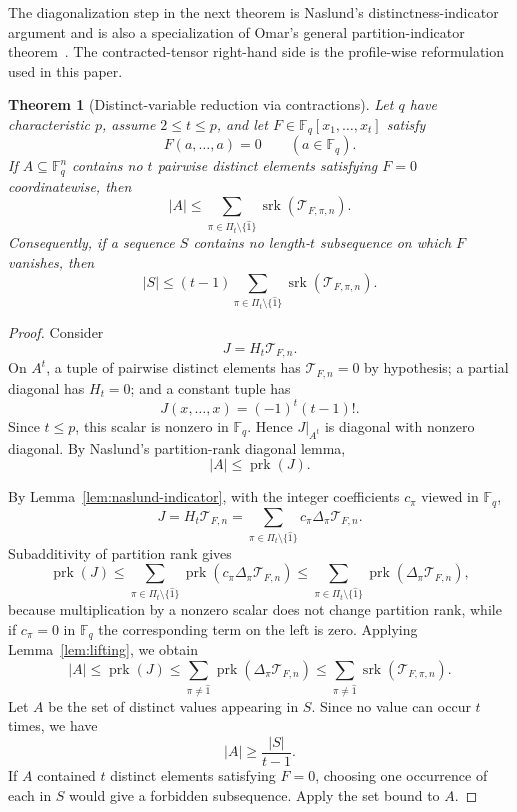 \documentclass[10pt,a4paper]{amsart}
\newtheorem{theorem}{Theorem}[section]
\theoremstyle{definition}
\newcommand{\F}{\mathbb F}
\newcommand{\srk}{\operatorname{srk}}
\newcommand{\prk}{\operatorname{prk}}
\newcommand{\1}{\mathbf 1}
\newcommand{\Tau}{\mathcal T}
\begin{document}
The diagonalization step in the next theorem is Naslund's distinctness-indicator argument and is also a specialization of Omar's general partition-indicator theorem~\cite[Theorem~8]{OmarPartition}.  The contracted-tensor right-hand side is the profile-wise reformulation used in this paper.

\begin{theorem}[Distinct-variable reduction via contractions]\label{thm:distinct-reduction}
Let $q$ have characteristic $p$, assume $2\le t\le p$, and let $F\in\F_q[x_1,\ldots,x_t]$ satisfy
\[
 F(a,\ldots,a)=0\qquad(a\in\F_q).
\]
If $A\subseteq\F_q^n$ contains no $t$ pairwise distinct elements satisfying $F=0$ coordinatewise, then
\[
 |A|
 \le
 \sum_{\pi\in\Pi_t\setminus\{\widehat1\}}
 \srk(\Tau_{F,\pi,n}).
\]
Consequently, if a sequence $S$ contains no length-$t$ subsequence on which $F$ vanishes, then
\[
 |S|
 \le
 (t-1)
 \sum_{\pi\in\Pi_t\setminus\{\widehat1\}}
 \srk(\Tau_{F,\pi,n}).
\]
\end{theorem}

\begin{proof}
Consider
\[
 J=H_t\Tau_{F,n}.
\]
On $A^t$, a tuple of pairwise distinct elements has
$\Tau_{F,n}=0$ by hypothesis; a partial diagonal has $H_t=0$;
and a constant tuple has
\[
 J(x,\ldots,x)=(-1)^t(t-1)!.
\]
Since $t\le p$, this scalar is nonzero in $\F_q$. Hence
$J|_{A^t}$ is diagonal with nonzero diagonal. By Naslund's
partition-rank diagonal lemma,
\[
 |A|\le\prk(J).
\]

By Lemma~\ref{lem:naslund-indicator}, with the integer coefficients
$c_\pi$ viewed in $\F_q$,
\[
 J
 =H_t\Tau_{F,n}
 =\sum_{\pi\in\Pi_t\setminus\{\widehat1\}}
 c_\pi\Delta_\pi\Tau_{F,n}.
\]
{Subadditivity of partition rank gives
\[
 \prk(J)
 \le
 \sum_{\pi\in\Pi_t\setminus\{\widehat1\}}
 \prk(c_\pi\Delta_\pi\Tau_{F,n})
 \le
 \sum_{\pi\in\Pi_t\setminus\{\widehat1\}}
 \prk(\Delta_\pi\Tau_{F,n}),
\]
because multiplication by a nonzero scalar does not change partition
rank, while if $c_\pi=0$ in $\F_q$ the corresponding term on the
left is zero. Applying Lemma~\ref{lem:lifting}, we obtain
\[
 |A|
 \le\prk(J)
 \le\sum_{\pi\ne\widehat1}\prk(\Delta_\pi\Tau_{F,n})
 \le\sum_{\pi\ne\widehat1}\srk(\Tau_{F,\pi,n}).
\]
Let \(A\) be the set of distinct values appearing in \(S\).
Since no value can occur \(t\) times, we have
\[
 |A|\ge \frac{|S|}{t-1}.
\]
If \(A\) contained \(t\) distinct elements satisfying \(F=0\),
choosing one occurrence of each in \(S\) would give a forbidden
subsequence. Apply the set bound to \(A\).}
\end{proof}
\end{document}
